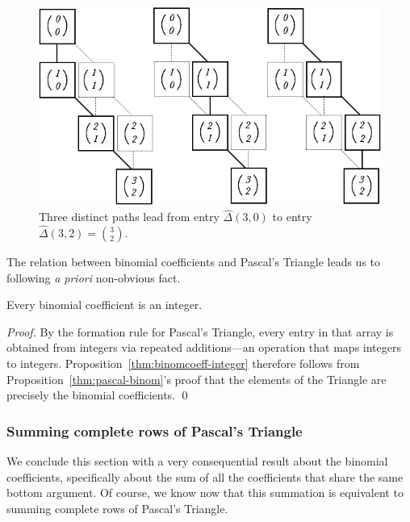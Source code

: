 \begin{figure}[htb]
\begin{center}
       \includegraphics[scale=0.4]{FiguresMaths/CoeffBinomiauxCounting}
\caption{Three distinct paths lead from entry $\hat{\Delta}(3,0)$ to entry $\hat{\Delta}(3,2) = {\displaystyle {3 \choose 2}}$.}
\label{fig:binomialCoeff3}
\end{center}
\end{figure}

\bigskip

The relation between binomial coefficients and Pascal's Triangle leads us to following {\it a priori} non-obvious fact.

\begin{prop}
\label{thm:binomcoeff-integer}
Every binomial coefficient is an integer.
\end{prop}

\begin{proof}
By the formation rule for Pascal's Triangle, every entry in that array is obtained from integers via repeated additions---an operation that maps integers to integers. Proposition~\ref{thm:binomcoeff-integer} therefore follows from Proposition~\ref{thm:pascal-binom}'s proof that the elements of the Triangle are precisely the binomial coefficients.  \qed
\end{proof}


\subsubsection{Summing complete rows of Pascal's Triangle}
\label{sec:summaion-BinCoeff}

We conclude this section with a very consequential result about the binomial coefficients, specifically about the sum of all the coefficients that share the same bottom argument.  Of course, we know now that this summation is equivalent to summing complete rows of Pascal's Triangle.


